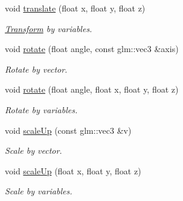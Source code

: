 \begin{DoxyCompactItemize}
\mbox{\label{class_transform_component_af495b5a63ba61ac9f67170ecf30769ac}} 
void \mbox{\hyperlink{class_transform_component_af495b5a63ba61ac9f67170ecf30769ac}{translate}} (float x, float y, float z)
\begin{DoxyCompactList}\small\item\em \mbox{\hyperlink{class_transform}{Transform}} by variables. \end{DoxyCompactList}\item 
\mbox{\label{class_transform_component_a54f3f0e7924028bb32279aac3938a149}} 
void \mbox{\hyperlink{class_transform_component_a54f3f0e7924028bb32279aac3938a149}{rotate}} (float angle, const glm\+::vec3 \&axis)
\begin{DoxyCompactList}\small\item\em Rotate by vector. \end{DoxyCompactList}\item 
\mbox{\label{class_transform_component_a7c97e7f1e9924b811319acb73accde72}} 
void \mbox{\hyperlink{class_transform_component_a7c97e7f1e9924b811319acb73accde72}{rotate}} (float angle, float x, float y, float z)
\begin{DoxyCompactList}\small\item\em Rotate by variables. \end{DoxyCompactList}\item 
\mbox{\label{class_transform_component_a45483b2f5f38819ad0db6fcfe0f0ded8}} 
void \mbox{\hyperlink{class_transform_component_a45483b2f5f38819ad0db6fcfe0f0ded8}{scale\+Up}} (const glm\+::vec3 \&v)
\begin{DoxyCompactList}\small\item\em Scale by vector. \end{DoxyCompactList}\item 
\mbox{\label{class_transform_component_a161374892f674b2e6d34bcaeb66a2a28}} 
void \mbox{\hyperlink{class_transform_component_a161374892f674b2e6d34bcaeb66a2a28}{scale\+Up}} (float x, float y, float z)
\begin{DoxyCompactList}\small\item\em Scale by variables. \end{DoxyCompactList}\item 

\end{DoxyCompactItemize}
